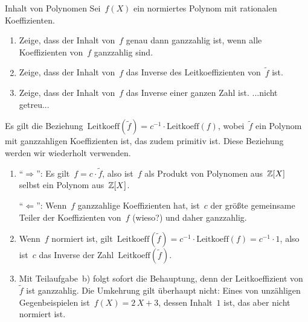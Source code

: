 \documentclass{algblatt}
\begin{document}
\begin{aufgabe}{Inhalt von Polynomen}
Sei~$f(X)$ ein normiertes Polynom mit rationalen Koeffizienten.
\begin{enumerate}
\item Zeige, dass der Inhalt von~$f$ genau dann ganzzahlig ist, wenn alle
Koeffizienten von~$f$ ganzzahlig sind.
\item Zeige, dass der Inhalt von~$f$ das Inverse des Leitkoeffizienten
von~$\widetilde f$ ist.
\item Zeige, dass der Inhalt von~$f$ das Inverse einer ganzen Zahl ist.
...nicht getreu...
\end{enumerate}

\begin{loesung}
\newcommand{\leit}[1]{\mathrm{Leitkoeff}(#1)}%
Es gilt die Beziehung~$\leit{\widetilde f} = c^{-1} \cdot \leit{f}$,
wobei~$\widetilde f$ ein Polynom mit ganzzahligen Koeffizienten ist, das zudem
primitiv ist. Diese Beziehung werden wir wiederholt verwenden.
\begin{enumerate}
\item "`$\Longrightarrow$"': Es gilt~$f = c \cdot \widetilde f$, also ist~$f$ als
Produkt von Polynomen aus~$\mathbb{Z}[X]$ selbst ein Polynom aus~$\mathbb{Z}[X]$.

"`$\Longleftarrow$"': Wenn~$f$ ganzzahlige Koeffizienten hat, ist~$c$ der
größte gemeinsame Teiler der Koeffizienten von~$f$ (wieso?) und daher ganzzahlig.

\item Wenn~$f$ normiert ist, gilt~$\leit{\widetilde f} = c^{-1} \cdot
\leit{f} = c^{-1} \cdot 1$, also ist~$c$ das Inverse der Zahl~$\leit{\widetilde f}$.

\item Mit Teilaufgabe~b) folgt sofort die Behauptung, denn der Leitkoeffizient
von~$\widetilde f$ ist ganzzahlig. Die Umkehrung gilt überhaupt nicht: Eines
von unzähligen Gegenbeispielen ist~$f(X) = 2\,X + 3$, dessen Inhalt~$1$ ist,
das aber nicht normiert ist.
\end{enumerate}
\end{loesung}
\end{aufgabe}
\end{document}
